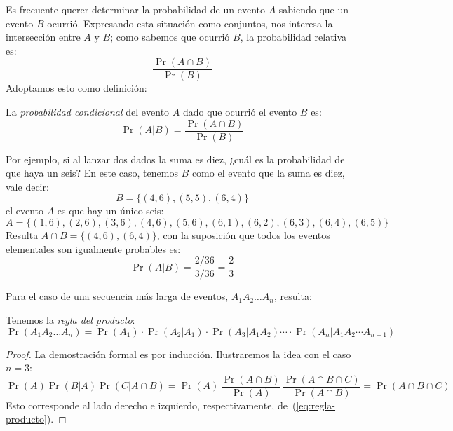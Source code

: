   Es frecuente querer determinar la probabilidad de un evento \(A\)
  sabiendo que un evento \(B\) ocurrió.
  Expresando esta situación como conjuntos,
  nos interesa la intersección entre \(A\) y \(B\);
  como sabemos que ocurrió \(B\),
  la probabilidad relativa es:
  \begin{equation*}
    \frac{\Pr(A \cap B)}{\Pr(B)}
  \end{equation*}
  Adoptamos esto como definición:
  \begin{definition}
    La \emph{probabilidad condicional} del evento \(A\)
    dado que ocurrió el evento \(B\) es:
    \begin{equation}
      \label{eq:def-conditional-probability}
      \Pr(A \vert B)
	= \frac{\Pr(A \cap B)}{\Pr(B)}
    \end{equation}
  \end{definition}
  Por ejemplo,
  si al lanzar dos dados la suma es diez,
  ¿cuál es la probabilidad de que haya un seis?
  En este caso,
  tenemos \(B\) como el evento que la suma es diez,
  vale decir:
  \begin{equation*}
    B = \{ (4, 6), (5, 5), (6, 4) \}
  \end{equation*}
  el evento \(A\) es que hay un único seis:
  \begin{equation*}
    A = \{ (1, 6), (2, 6), (3, 6), (4, 6), (5, 6),
	   (6, 1), (6, 2), (6, 3), (6, 4), (6, 5) \}
  \end{equation*}
  Resulta \(A \cap B = \{ (4, 6), (6, 4) \}\),
  con la suposición que todos los eventos elementales
  son igualmente probables es:
  \begin{equation*}
    \Pr(A \vert B)
      = \frac{2 / 36}{3 / 36}
      = \frac{2}{3}
  \end{equation*}

  Para el caso de una secuencia más larga de eventos,
  \(A_1 A_2 \dots A_n\),
  resulta:
  \begin{theorem}
    \label{theo:regla-producto}
    Tenemos la \emph{regla del producto}:
    \begin{equation}
      \label{eq:regla-producto}
      \Pr(A_1 A_2 \dots A_n)
	= \Pr(A_1)
	    \cdot \Pr(A_2 \vert A_1)
	    \cdot \Pr(A_3 \vert A_1 A_2)
	    \dotsm
	    \cdot \Pr(A_n \vert A_1 A_2 \dotsm A_{n - 1})
    \end{equation}
  \end{theorem}
  \begin{proof}
    La demostración formal es por inducción.%
    Ilustraremos la idea con el caso \(n = 3\):
    \begin{equation*}
      \Pr(A) \Pr(B \vert A) \Pr(C \vert A \cap B)
	= \Pr(A)
	    \, \frac{\Pr(A \cap B)}{\Pr(A)}
	    \, \frac{\Pr(A \cap B \cap C)}{\Pr(A \cap B)}
	= \Pr(A \cap B \cap C)
    \end{equation*}
    Esto corresponde al lado derecho e izquierdo,
    respectivamente,
    de~(\ref{eq:regla-producto}).
  \end{proof}

